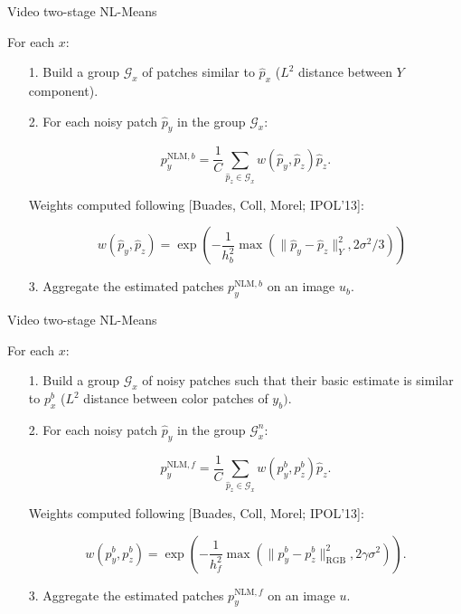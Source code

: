 \documentclass[mathserif]{beamer}
\makeatletter
\newcounter{multipleslide}
\newcommand{\multipleframe}{%
\setcounter{multipleslide}{\value{framenumber}}
\stepcounter{multipleslide}
\patchcmd{\beamer@@tmpl@footline}%
	{\insertframenumber}%
	{\themultipleslide}%
	{}%
	{}%
}
\newcommand{\restoreframe}{%
\patchcmd{\beamer@@tmpl@footline}%
	{\themultipleslide}%
	{\insertframenumber}%
	{}%
	{}%
\setcounter{framenumber}{\value{multipleslide}}%
}
\makeatother
\begin{document}
\multipleframe
\begin{frame}{Video two-stage NL-Means}
	
	 For each $x$:

	\begin{enumerate}
		\item[1.] Build a group $\mathcal G_x$ of patches similar to $\hat p_x$ ($L^2$
			distance between $Y$ component).
	
		\item[2.] For each noisy patch $\hat p_y$ in the group $\mathcal G_x$:

	\[p_y^{\text{NLM},b} = \frac1{C}\sum_{\hat p_z\in\mathcal G_x} w(\hat p_y, \hat p_z)\hat p_z.\]

		Weights computed following [Buades, Coll, Morel; IPOL'13]:

	\[\quad\displaystyle w(\hat p_y, \hat p_z) = \exp\left(-\frac1{h_b^2}\max(\|\hat p_y - \hat p_z\|_Y^2, 2\sigma^2/3)\right)\]
	
		\item[3.] Aggregate the estimated patches $p_y^{\text{NLM},b}$ on an image $u_b$.

	\end{enumerate}
	
\end{frame}

\begin{frame}{Video two-stage NL-Means}
	
	 For each $x$:

	\begin{enumerate}
		\item[1.] Build a group $\mathcal G_x$ of noisy patches such that their basic
			estimate is similar to $p_x^b$ ($L^2$ distance
			between color patches of $y_b)$.
	
		\item[2.] For each noisy patch $\hat p_y$ in the group $\mathcal G^n_x$:

	\[p_y^{\text{NLM},f} = \frac1{C}\sum_{\hat p_z\in\mathcal G_x} w(p^b_y, p^b_z)\hat p_z.\]

		Weights computed following [Buades, Coll, Morel; IPOL'13]:

	\[w(p^b_y, p^b_z) = \exp\left(-\frac1{h_f^2}\max(\|p^b_y - p^b_z\|_{\text{RGB}}^2, 2\gamma\sigma^2)\right).\]
	
		\item[3.] Aggregate the estimated patches $p_y^{\text{NLM},f}$ on an image $u$.

	\end{enumerate}
	
\end{frame}
\restoreframe
\end{document}
